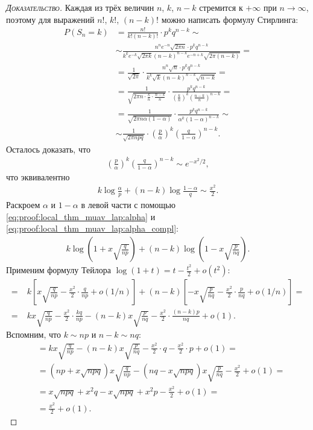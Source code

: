 \documentclass[../main.tex]{subfiles}
\begin{document}
\begin{proof}[\normalfont\textsc{Доказательство}]
 Каждая из трёх величин $n$, $k$, $n - k$ стремится к $+\infty$ при $ n \to \infty $, поэтому для выражений $ n! $, $ k! $, $ (n-k)! $ можно написать формулу Стирлинга:
 \begin{align*}
  P(S_n = k) &= \frac{n!}{k!(n-k)!} \cdot p^{k}q^{n-k} \sim \\
  &\sim \frac{n^{n}e^{-n}\sqrt{2\pi n} \cdot p^{k}q^{n-k}}{k^{k}e^{-k}\sqrt{2\pi k}(n-k)^{n-k}e^{-n+k}\sqrt{2\pi (n-k)}} = \\
  &= \frac{1}{\sqrt{2\pi}} \cdot \frac{n^{n}\sqrt{n} \cdot p^{k}q^{n-k}}{k^{k}\sqrt{k}(n-k)^{n-k} \sqrt{n-k}} = \\
  &= \frac{1}{\sqrt{2 \pi n \cdot \frac{k}{n} \cdot \frac{n-k}{n}}} \cdot \frac{p^{k}q^{n-k}}{(\frac{k}{n})^{k}(\frac{n-k}{n})^{n-k}} = \\
  &= \frac{1}{\sqrt{2 \pi n \alpha (1-\alpha)}} \cdot \frac{p^{k}q^{n-k}}{\alpha^{k}(1 - \alpha)^{n-k}} \sim \\
  &\sim \frac{1}{\sqrt{2\pi n p q}} \cdot \left(\frac{p}{\alpha}\right)^{k} \left( \frac{q}{1 - \alpha} \right)^{n-k}.
 \end{align*} Осталось доказать, что
 \begin{align*}
  \left( \frac{p}{\alpha} \right)^{k} \left( \frac{q}{1-\alpha} \right)^{n-k} \sim e^{-x^{2} / 2},
 \end{align*} что эквивалентно
 \begin{align*}
  k \log \frac{\alpha}{p} + (n-k) \log \frac{1 - \alpha}{q} \sim \frac{x^{2}}{2}
 .\end{align*} Раскроем $ \alpha $ и $ 1 - \alpha $ в левой части с помощью \eqref{eq:proof:local_thm_muav_lap:alpha} и \eqref{eq:proof:local_thm_muav_lap:alpha_compl}:
 \begin{align*}
  k \log\left(1 + x \sqrt{\frac{q}{np}}\right) + (n-k)\log \left( 1 - x \sqrt{\frac{p}{nq}} \right).
 \end{align*} Применим формулу Тейлора $\log(1 + t) = t - \frac{t^{2}}{2} + o(t^{2})$:
 \begin{align*}
  =\;&k \left[x \sqrt{\frac{q}{np}} - \frac{x^{2}}{2} \cdot \frac{q}{np} + o(1 / n)\right] + (n-k) \left[ -x \sqrt{\frac{p}{nq}}  - \frac{x^{2}}{2} \cdot \frac{p}{nq} + o(1 / n) \right] = \\
  =\;&k x \sqrt{\frac{q}{np}} - \frac{x^{2}}{2}\cdot\frac{kq}{np} - (n-k)x \sqrt{\frac{p}{nq}} - \frac{x^{2}}{2} \cdot \frac{(n-k)p}{nq} + o(1).
 \end{align*} Вспомним, что $k \sim np$ и $n-k\sim nq$:
 \begin{align*}
  &=kx \sqrt{\frac{q}{np}} - (n-k)x \sqrt{\frac{p}{nq}} - \frac{x^{2}}{2} \cdot q - \frac{x^{2}}{2} \cdot p + o(1) = \\
  &= (np + x \sqrt{npq})x \sqrt{\frac{q}{np}} - (nq - x\sqrt{npq})x\sqrt{\frac{p}{nq}} - \frac{x^{2}}{2} + o(1) = \\
  &= x\sqrt{npq} + x^{2} q - x\sqrt{npq} + x^{2}p - \frac{x^{2}}{2} + o(1) = \\
  &= \frac{x^{2}}{2} + o(1).
 \end{align*}
\end{proof}
\end{document}
